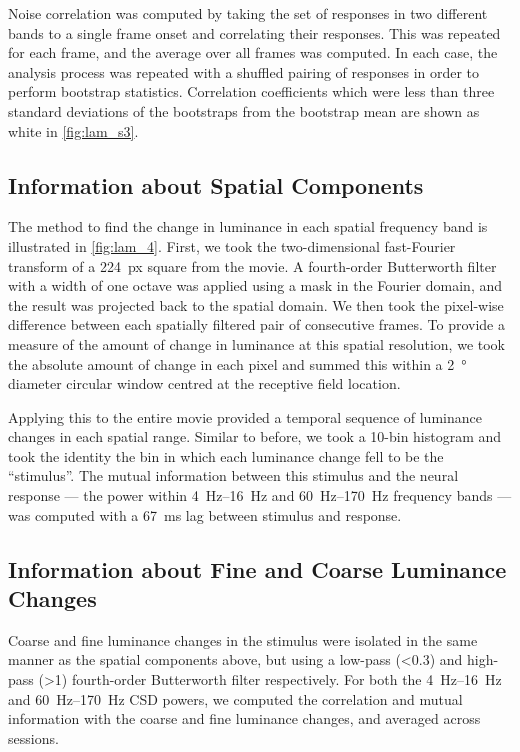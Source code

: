 Noise correlation was computed by taking the set of responses in two different bands to a single frame onset and correlating their responses.
This was repeated for each frame, and the average over all frames was computed.
In each case, the analysis process was repeated with a shuffled pairing of responses in order to perform bootstrap statistics.
Correlation coefficients which were less than three standard deviations of the bootstraps from the bootstrap mean are shown as white in \autoref{fig:lam_s3}.


\subsection{Information about Spatial Components}

The method to find the change in luminance in each spatial frequency band is illustrated in \autoref{fig:lam_4}.
First, we took the two-dimensional fast-Fourier transform of a \SI{224}{px} square from the movie.
A fourth-order Butterworth filter with a width of one octave was applied using a mask in the Fourier domain, and the result was projected back to the spatial domain.
We then took the pixel-wise difference between each spatially filtered pair of consecutive frames.
To provide a measure of the amount of change in luminance at this spatial resolution, we took the absolute amount of change in each pixel and summed this within a \SI{2}{\degree} diameter circular window centred at the receptive field location.

Applying this to the entire movie provided a temporal sequence of luminance changes in each spatial range.
Similar to before, we took a \num{10}-bin histogram and took the identity the bin in which each luminance change fell to be the ``stimulus''.
The mutual information between this stimulus and the neural response --- the power within \SIrange{4}{16}{Hz} and \SIrange{60}{170}{Hz} frequency bands --- was computed with a \SI{67}{\milli\second} lag between stimulus and response.


\subsection{Information about Fine and Coarse Luminance Changes}

Coarse and fine luminance changes in the stimulus were isolated in the same manner as the spatial components above, but using a low-pass (\SI{<0.3}{\cpd}) and high-pass (\SI{>1}{\cpd}) fourth-order Butterworth filter respectively.
For both the \SIrange{4}{16}{Hz} and \SIrange{60}{170}{Hz} \ac{CSD} powers, we computed the correlation and mutual information with the coarse and fine luminance changes, and averaged across sessions.


